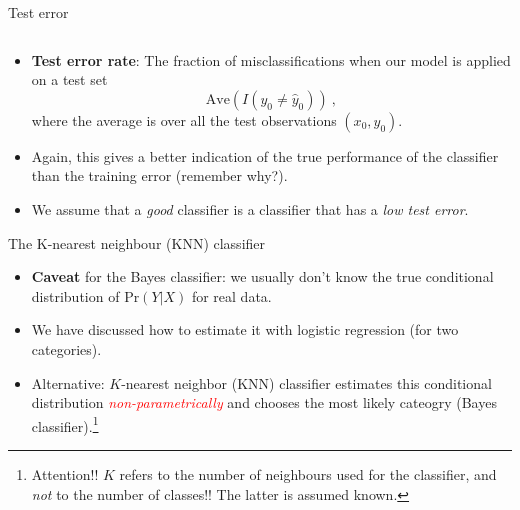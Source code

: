 \documentclass[10pt,ignorenonframetext,]{beamer}
\providecommand{\tightlist}{%
  \setlength{\itemsep}{0pt}\setlength{\parskip}{0pt}}
\begin{document}
\begin{frame}

\begin{block}{Test error}

\(~\)

\begin{itemize}
\tightlist
\item
  \textbf{Test error rate}: The fraction of misclassifications when our
  model is applied on a test set
  \[\text{Ave}(I(y_0\neq \hat{y}_0)) \ ,\] where the average is over all
  the test observations \((x_0,y_0)\).
\end{itemize}

\vspace{2mm}

\begin{itemize}
\tightlist
\item
  Again, this gives a better indication of the true performance of the
  classifier than the training error (remember why?).
\end{itemize}

\vspace{2mm}

\begin{itemize}
\tightlist
\item
  We assume that a \emph{good} classifier is a classifier that has a
  \emph{low test error}.
\end{itemize}

\end{block}

\end{frame}

\begin{frame}{The K-nearest neighbour (KNN) classifier}
\protect\hypertarget{the-k-nearest-neighbour-knn-classifier}{}

\begin{itemize}
\tightlist
\item
  \textbf{Caveat} for the Bayes classifier: we usually don't know the
  true conditional distribution of \(\text{Pr}(Y | X)\) for real data.
\end{itemize}

\vspace{1mm}

\begin{itemize}
\tightlist
\item
  We have discussed how to estimate it with logistic regression (for two
  categories).
\end{itemize}

\vspace{1mm}

\begin{itemize}
\tightlist
\item
  Alternative: \(K\)-nearest neighbor (KNN) classifier estimates this
  conditional distribution \emph{\textcolor{red}{non-parametrically}}
  and chooses the most likely cateogry (Bayes
  classifier).\footnote{Attention!! $K$ refers to the number of neighbours used for the classifier, and \emph{not} to the number of classes!! The latter is assumed known.}
\end{itemize}

\end{frame}
\end{document}

